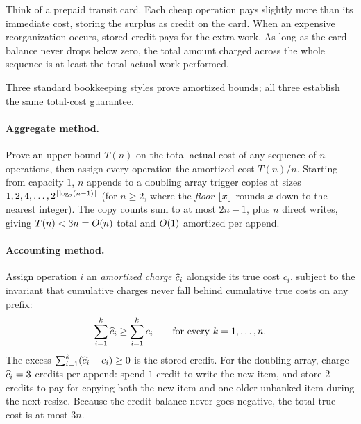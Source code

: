 \begin{intuitionbox}
Think of a prepaid transit card. Each cheap operation pays slightly more than its immediate cost, storing the surplus as credit on the card. When an expensive reorganization occurs, stored credit pays for the extra work. As long as the card balance never drops below zero, the total amount charged across the whole sequence is at least the total actual work performed.
\end{intuitionbox}

Three standard bookkeeping styles prove amortized bounds; all three establish the same total-cost guarantee.

\paragraph{Aggregate method.} Prove an upper bound $T(n)$ on the total actual cost of any sequence of $n$ operations, then assign every operation the amortized cost $T(n)/n$. Starting from capacity $1$, $n$ appends to a doubling array trigger copies at sizes $1, 2, 4, \dots, 2^{\lfloor\log_2(n-1)\rfloor}$ (for $n \ge 2$, where the \emph{floor} $\lfloor x\rfloor$ rounds $x$ down to the nearest integer). The copy counts sum to at most $2n - 1$, plus $n$ direct writes, giving $T(n) < 3n = O(n)$ total and $O(1)$ amortized per append.

\paragraph{Accounting method.} Assign operation $i$ an \emph{amortized charge} $\widehat{c}_i$ alongside its true cost $c_i$, subject to the invariant that cumulative charges never fall behind cumulative true costs on any prefix:
\[
  \sum_{i=1}^k \widehat{c}_i \ge \sum_{i=1}^k c_i \qquad \text{for every } k = 1, \dots, n.
\]
The excess $\sum_{i=1}^k (\widehat{c}_i - c_i) \ge 0$ is the stored credit. For the doubling array, charge $\widehat{c}_i = 3$ credits per append: spend $1$ credit to write the new item, and store $2$ credits to pay for copying both the new item and one older unbanked item during the next resize. Because the credit balance never goes negative, the total true cost is at most $3n$.

